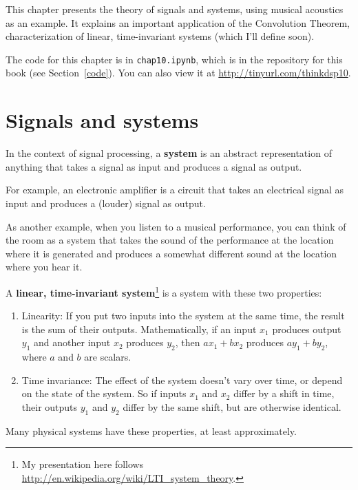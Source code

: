 \documentclass[12pt]{book} \usepackage[width=5.5in,height=8.5in, hmarginratio=3:2,vmarginratio=1:1]{geometry}
\begin{document}
This chapter presents the theory of signals and systems, using musical acoustics as an example. It explains an important application of the Convolution Theorem, characterization of linear, time-invariant systems (which I'll define soon). 

The code for this chapter is in {\tt chap10.ipynb}, which is in the repository for this book (see Section~\ref{code}). You can also view it at \url{http://tinyurl.com/thinkdsp10}. 

\section{Signals and systems} 

In the context of signal processing, a {\bf system} is an abstract representation of anything that takes a signal as input and produces a signal as output. 

For example, an electronic amplifier is a circuit that takes an electrical signal as input and produces a (louder) signal as output. 

As another example, when you listen to a musical performance, you can think of the room as a system that takes the sound of the performance at the location where it is generated and produces a somewhat different sound at the location where you hear it. 

A {\bf linear, time-invariant system}\footnote{My presentation here follows \url{http://en.wikipedia.org/wiki/LTI_system_theory}.} is a system with these two properties: 

\begin{enumerate} 

\item Linearity: If you put two inputs into the system at the same time, the result is the sum of their outputs. Mathematically, if an input $x_1$ produces output $y_1$ and another input $x_2$ produces $y_2$, then $a x_1 + b x_2$ produces $a y_1 + b y_2$, where $a$ and $b$ are scalars. 

\item Time invariance: The effect of the system doesn't vary over time, or depend on the state of the system. So if inputs $x_1$ and $x_2$ differ by a shift in time, their outputs $y_1$ and $y_2$ differ by the same shift, but are otherwise identical. 

\end{enumerate} 

Many physical systems have these properties, at least approximately. 
\end{document}

